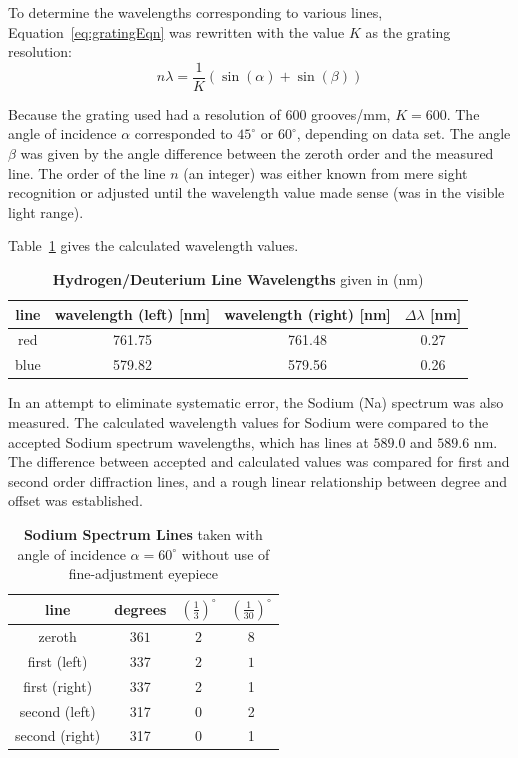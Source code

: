 \documentclass[paper=a4, fontsize=11pt]{scrartcl} %
\numberwithin{equation}{section}
\numberwithin{figure}{section}
\numberwithin{table}{section}
\begin{document}
To determine the wavelengths corresponding to various lines, Equation~\ref{eq:gratingEqn} was rewritten with the value $K$ as the grating resolution:
\begin{equation}
\label{eq:wavelengthEqn}
n \lambda = \dfrac{1}{K} \left( \sin(\alpha) + \sin(\beta) \right)
\end{equation}

 Because the grating used had a resolution of $600$ grooves/mm, $K=600$. The angle of incidence $\alpha$ corresponded to $45^\circ$ or $60^\circ$, depending on data set. The angle $\beta$ was given by the angle difference between the zeroth order and the measured line. The order of the line $n$ (an integer) was either known from mere sight recognition or adjusted until the wavelength value made sense (was in the visible light range).

Table~\ref{table:hd-calculated} gives the calculated wavelength values.

\begin{table}[H]
\centering
\caption{\textbf{Hydrogen/Deuterium Line Wavelengths} given in (nm) }
\begin{tabular}{ || c | c c c || }
  \hline
  \hline
  line & wavelength (left) [nm] & wavelength (right) [nm] & $\Delta \lambda$ [nm]  \\
  \hline
  red & 761.75 & 761.48 & 0.27 \\
  blue & 579.82 & 579.56 & 0.26 \\
  \hline
  \hline
\end{tabular}
\label{table:hd-calculated}
\end{table}

\vspace{1.7em}


In an attempt to eliminate systematic error, the Sodium (Na) spectrum was also measured. The calculated wavelength values for Sodium were compared to the accepted Sodium spectrum wavelengths, which has lines at $589.0$ and $589.6$ nm. The difference between accepted and calculated values was compared for first and second order diffraction lines, and a rough linear relationship between degree and offset was established.

\begin{table}[H]
\centering
\caption{\textbf{Sodium Spectrum Lines} taken with angle of incidence $\alpha = 60^\circ$ without use of fine-adjustment eyepiece }
\begin{tabular}{ || c | c c c || }
  \hline
  \hline
  line & degrees & $(\frac{1}{3})^\circ$ & $(\frac{1}{30})^\circ$  \\
  \hline
  zeroth & $361$ & $2$ & $8$  \\
  first (left) & 337 & $2$ & $1$  \\
  first (right) & 337 & 2 & 1 \\
  second (left) & 317 & 0 & 2 \\
  second (right) & 317 & 0 & 1 \\
  \hline
  \hline
\end{tabular}
\label{table:sodium60}
\end{table}
\end{document}
